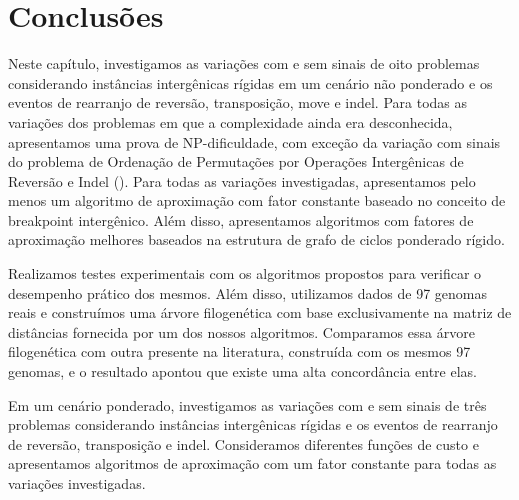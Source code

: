 \section{Conclusões}

Neste capítulo, investigamos as variações com e sem sinais de oito problemas considerando instâncias intergênicas rígidas em um cenário não ponderado e os eventos de rearranjo de reversão, transposição, move e indel. Para todas as variações dos problemas em que a complexidade ainda era desconhecida, apresentamos uma prova de NP-dificuldade, com exceção da variação com sinais do problema de Ordenação de Permutações por Operações Intergênicas de Reversão e Indel (\SbIRI). Para todas as variações investigadas, apresentamos pelo menos um algoritmo de aproximação com fator constante baseado no conceito de breakpoint intergênico. Além disso, apresentamos algoritmos com fatores de aproximação melhores baseados na estrutura de grafo de ciclos ponderado rígido.

Realizamos testes experimentais com os algoritmos propostos para verificar o desempenho prático dos mesmos. Além disso, utilizamos dados de 97 genomas reais e construímos uma árvore filogenética com base exclusivamente na matriz de distâncias fornecida por um dos nossos algoritmos. Comparamos essa árvore filogenética com outra presente na literatura, construída com os mesmos 97 genomas, e o resultado apontou que existe uma alta concordância entre elas.

Em um cenário ponderado, investigamos as variações com e sem sinais de três problemas considerando instâncias intergênicas rígidas e os eventos de rearranjo de reversão, transposição e indel. Consideramos diferentes funções de custo e apresentamos algoritmos de aproximação com um fator constante para todas as variações investigadas.